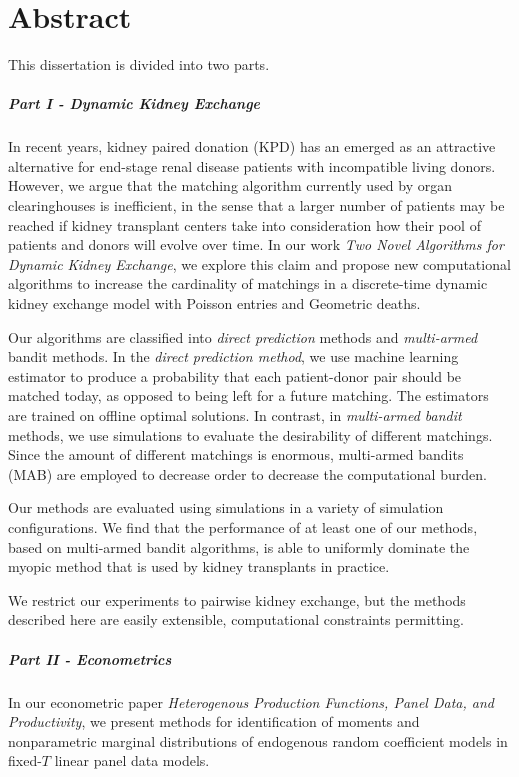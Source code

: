 \chapter{Abstract}

\doublespacing
This dissertation is divided into two parts.

\paragraph{Part I - Dynamic Kidney Exchange} In recent years, kidney paired donation (KPD) has an emerged as an attractive alternative for end-stage renal disease patients with incompatible living donors. However, we argue that the matching algorithm currently used by organ clearinghouses is inefficient, in the sense that a larger number of patients may be reached if kidney transplant centers take into consideration how their pool of patients and donors will evolve over time. In our work \emph{Two Novel Algorithms for Dynamic Kidney Exchange}, we explore this claim and propose new computational algorithms to increase the cardinality of matchings in a discrete-time dynamic kidney exchange model with Poisson entries and Geometric deaths. 

Our algorithms are classified into \emph{direct prediction} methods and \emph{multi-armed} bandit methods. In the \emph{direct prediction method}, we use machine learning estimator to produce a probability that each patient-donor pair should be matched today, as opposed to being left for a future matching. The estimators are trained on offline optimal solutions. In contrast, in \emph{multi-armed bandit} methods, we use simulations to evaluate the desirability of different matchings. Since the amount of different matchings is enormous, multi-armed bandits (MAB) are employed to decrease order to decrease the computational burden.

Our methods are evaluated using simulations in a variety of simulation configurations. We find that the performance of at least one of our methods, based on multi-armed bandit algorithms, is able to uniformly dominate the myopic method that is used by kidney transplants in practice.

We restrict our experiments to pairwise kidney exchange, but the methods described here are easily extensible, computational constraints permitting. 

\paragraph{Part II - Econometrics}  In our econometric paper \emph{Heterogenous Production Functions, Panel Data, and Productivity}, we present methods for identification of moments and nonparametric marginal distributions of endogenous random coefficient models in fixed-$T$ linear panel data models. 

